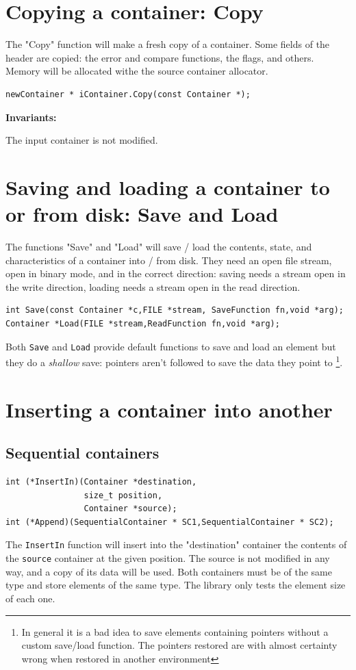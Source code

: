 \documentclass[12pt,a4paper,openany]{memoir} %
\newcommand{\Const}{
{\par\noindent \textbf{Invariants:}\noindent}
}
\begin{document}
\section{Copying a container: Copy}
\noindent The "Copy" function will make a fresh copy of a container. Some fields of the header are copied: the error and compare functions, the flags, and others. Memory will be allocated withe the source container allocator.
\begin{verbatim}
newContainer * iContainer.Copy(const Container *);
\end{verbatim}
\Const The input container is not modified.
\section{Saving and loading a container to or from disk: Save and Load}
The functions "Save" and "Load" will save / load the contents, state, and characteristics of a container into / from disk. They need an open file stream, open in binary mode, and in the correct direction: saving needs a stream open in the write direction, loading needs a stream open in the read direction.
\begin{verbatim}
int Save(const Container *c,FILE *stream, SaveFunction fn,void *arg);
Container *Load(FILE *stream,ReadFunction fn,void *arg);
\end{verbatim}
Both \texttt{Save} and \texttt{Load} provide default functions to save and load an element but they do a \textsl{shallow} save: pointers aren't followed 
to save the data they point to \footnote{In general it is a bad idea to save elements containing pointers without a custom save/load function. The 
pointers restored are with almost certainty wrong when restored in another environment}.
\section{Inserting a container into another}
\subsection{Sequential containers}
\noindent
\begin{verbatim}
int (*InsertIn)(Container *destination,
                size_t position,
                Container *source);
int (*Append)(SequentialContainer * SC1,SequentialContainer * SC2);
\end{verbatim}
The \texttt{InsertIn} function will insert into the "destination" container the contents of the \verb,source, container at the given position. The source is not modified in any way, and a copy of its data will be used. Both containers must be of the same type and store elements of  the same type. The library only tests the element size of each one.
\end{document}
